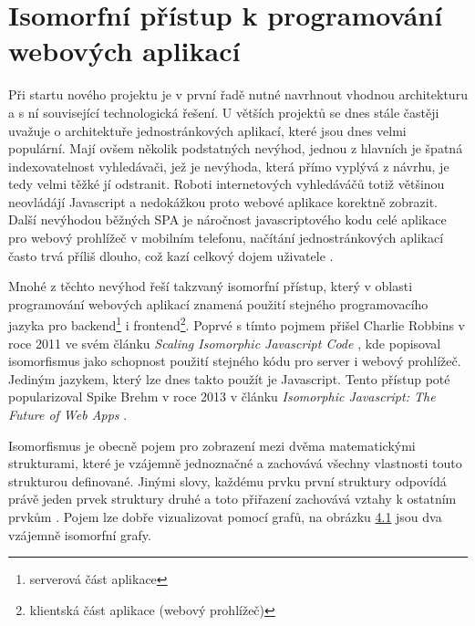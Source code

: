 \chapter{Isomorfní přístup k programování webových aplikací}
\label{sec:isomorphic}
Při startu nového projektu je v první řadě nutné navrhnout vhodnou architekturu a s ní související technologická řešení. U větších projektů se dnes stále častěji uvažuje o architektuře jednostránkových aplikací, které jsou dnes velmi populární. Mají ovšem několik podstatných nevýhod, jednou z hlavních je špatná indexovatelnost vyhledávači, jež je nevýhoda, která přímo vyplývá z návrhu, je tedy velmi těžké jí odstranit. Roboti internetových vyhledáváčů totiž většinou neovládájí Javascript a nedokážkou proto webové aplikace korektně zobrazit. Další nevýhodou běžných SPA je náročnost javascriptového kodu celé aplikace pro webový prohlížeč v mobilním telefonu, načítání jednostránkových aplikací často trvá příliš dlouho, což kazí celkový dojem uživatele \cite{spa} \cite{spa_book}. 

Mnohé z těchto nevýhod řeší takzvaný isomorfní přístup, který v oblasti programování webových aplikací znamená použití stejného programovacího jazyka pro backend\footnote{serverová část aplikace} i frontend\footnote{klientská část aplikace (webový prohlížeč)}. Poprvé s tímto pojmem přišel Charlie Robbins v roce 2011 ve svém článku \textit{Scaling Isomorphic Javascript Code} \cite{isomorphic_founder}, kde popisoval isomorfismus jako schopnost použití stejného kódu pro server i webový prohlížeč. Jediným jazykem, který lze dnes takto použít je Javascript. Tento přístup poté popularizoval Spike Brehm v roce 2013 v článku \textit{Isomorphic Javascript: The Future of Web Apps} \cite{isomorphic_airbnb2}.

Isomorfismus je obecně pojem pro zobrazení mezi dvěma matematickými strukturami, které je vzájemně jednoznačné a zachovává všechny vlastnosti touto strukturou definované. Jinými slovy, každému prvku první struktury odpovídá právě jeden prvek struktury druhé a toto přiřazení zachovává vztahy k ostatním prvkům \cite{isomorphic_def}. Pojem lze dobře vizualizovat pomocí grafů, na obrázku \hyperref[label:isomorphic_graph]{4.1} jsou dva vzájemně isomorfní grafy.

